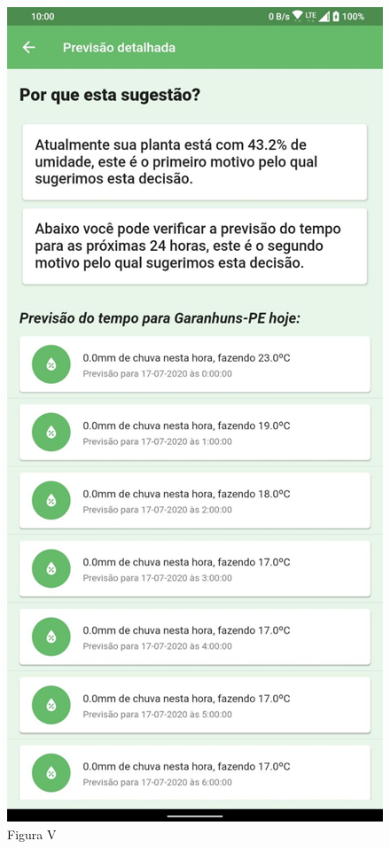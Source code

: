 \documentclass[eso]{bcc}
\begin{document}
\begin{figure}[htbp]
\centerline{\includegraphics[scale=.25]{Figuras/figura-v.jpg}}
\caption{Figura V}\label{fig-v}
\end{figure}
\end{document}
